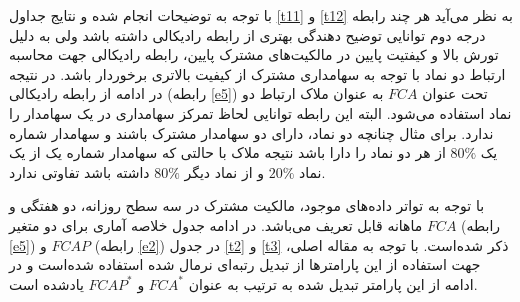 \documentclass[12pt]{article}
\begin{document}
        
  با توجه به توضیحات انجام شده و نتایج جداول 
  \ref{t11}
  و 
  \ref{t12}
  به نظر می‌آید هر چند رابطه درجه دوم توانایی توضیح دهندگی بهتری از رابطه رادیکالی داشته باشد ولی به دلیل تورش بالا و کیفتیت پایین در مالکیت‌های مشترک پایین، رابطه رادیکالی جهت محاسبه ارتباط دو نماد با توجه به سهامداری مشترک از کیفیت بالاتری برخوردار باشد. 
   در نتیجه در ادامه از رابطه رادیکالی  
           (رابطه \ref{e5}) تحت عنوان 
           $ FCA $
           به عنوان ملاک ارتباط دو نماد استفاده می‌شود.
البته این رابطه توانایی لحاظ تمرکز سهامداری در یک سهامدار را ندارد. برای مثال چنانچه دو نماد، دارای دو سهامدار مشترک باشند و سهامدار شماره یک  $ 80\% $ از هر دو نماد را دارا باشد نتیجه ملاک با حالتی که سهامدار شماره یک از یک نماد $ 20 \% $ و از نماد دیگر $ 80\% $ داشته باشد تفاوتی ندارد.
  
  
  با توجه به تواتر داده‌های موجود، مالکیت مشترک در سه سطح روزانه، دو هفتگی و ماهانه قابل تعریف می‌باشد. در ادامه جدول خلاصه آماری  برای دو متغیر 
  $ FCA $ 
  (رابطه 
  \ref{e5})
  و 
  $ FCAP $
  (رابطه 
  \ref{e2})
  در جدول 
  \ref{t2}
  و
  \ref{t3}
  ذکر شده‌است. با توجه به مقاله اصلی، جهت استفاده از این پارامتر‌ها از تبدیل رتبه‌ای نرمال شده استفاده شده‌است و در ادامه از این پارامتر تبدیل شده به ترتیب به عنوان 
  $ FCA^*$
  و
  $ FCAP^* $
  یاد‌شده است.
   
  {\begin{table}[htbp]
    \centering
        \caption{خلاصه آماری پارامتر 
        FCA
        در تواتر‌های مختلف  }
        \label{t2}
  \end{table}}
  
\end{document}
